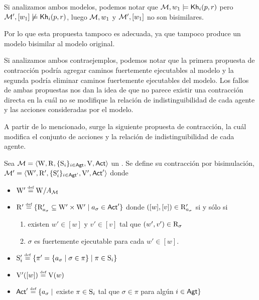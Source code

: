 Si analizamos ambos modelos, podemos notar que $\modults,w_1 \models \khi(p,r)$ pero $\modults',[w_1] \not\models \khi(p,r)$, luego 
$\modults,w_1$ y $\modults',[w_1]$ no son bisimilares.

Por lo que esta propuesta tampoco es adecuada, ya que tampoco produce un modelo bisimilar al modelo original.

Si analizamos ambos contraejemplos, podemos notar que la primera propuesta de contracción podría agregar caminos fuertemente ejecutables al modelo 
y la segunda podría eliminar caminos fuertemente ejecutables del modelo. Los fallos de ambas propuestas nos dan la idea de que no parece 
existir una contracción directa en la cuál no se modifique la relación de indistinguibilidad de cada agente y las acciones 
consideradas por el modelo. 

A partir de lo mencionado, surge la siguiente propuesta de contracción, la cuál modifica el conjunto de acciones y la relación de indistinguibilidad 
de cada agente.


\begin{definicion}
    Sea $\model=\tup{\W,\R,\cset{\S_i}_{i \in \AGT},\V,\ACT}$ un \ults. Se define su contracción por bisimulación, $\model'=\tup{\W',\R',\cset{\S_i'}_{i \in \AGT'},\V',\ACT'}$ donde 
    \begin{center}
        \begin{itemize}
            \item $\W' \eqdef \W/A_\modults$
            \item $\R' \eqdef \{\R'_{a_\sigma} \subseteq \W' \times \W' \mid a_\sigma \in \ACT'\}$ donde $([w],[v]) \in \R'_{a_\sigma}$ si y sólo si
            \begin{enumerate}
                \item existen $w' \in [w]$ y $v' \in [v]$ tal que $(w',v')\in \R_\sigma$
                \item $\sigma$ es fuertemente ejecutable para cada $w' \in [w]$.
            \end{enumerate}
            \item $\S_i' \eqdef \{ \pi' = \{a_\sigma \mid \sigma \in \pi\} \mid \pi \in \S_i \}$
            \item $\V'([w]) \eqdef \V(w)$
            \item $\ACT' \eqdef \{a_\sigma \mid $ existe $ \pi\in \S_i$ tal que $ \sigma \in \pi$ para algún $i \in \AGT \}$ 
        \end{itemize}
    \end{center}
\end{definicion}
    
